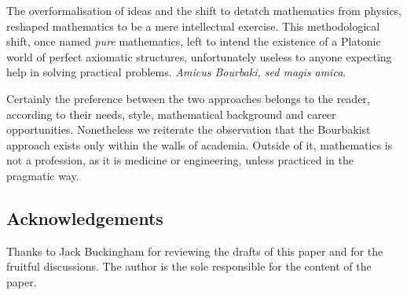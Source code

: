 \documentclass[]{scrartcl}
\theoremstyle{definition}
\begin{document}
The overformalisation of ideas and the shift to detatch mathematics from physics, reshaped mathematics to be a mere intellectual exercise. This methodological shift, once named \emph{pure} mathematics, left to intend the existence of a Platonic world of perfect axiomatic structures, unfortunately useless to anyone expecting help in solving practical problems. \emph{Amicus Bourbaki, sed magis amica}.

Certainly the preference between the two approaches belongs to the reader, according to their needs, style, mathematical background and career opportunities. Nonetheless we reiterate the observation that the Bourbakist approach exists only within the walls of academia. Outside of it, mathematics is not a profession, as it is medicine or engineering, unless practiced in the pragmatic way.


\begin{small}
    \section*{Acknowledgements}

    Thanks to Jack Buckingham for reviewing the drafts of this paper and for the fruitful discussions. The author is the sole responsible for the content of the paper.
        
\end{small}





\end{document}
